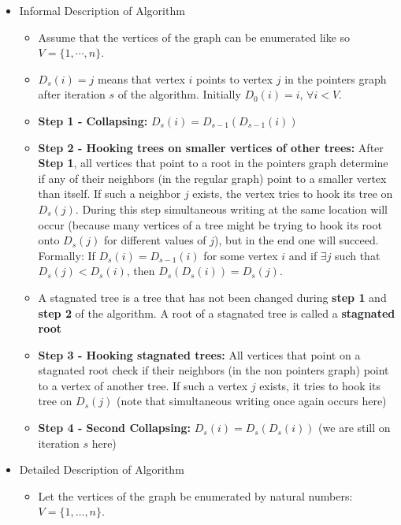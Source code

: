 \documentclass[a4paper]{article}
\begin{document}
\begin{itemize}
\begin{itemize}
\end{itemize}

\item Informal Description of Algorithm
\begin{itemize}
\item Assume that the vertices of the graph can be enumerated like so $V = \{1, \cdots, n\}$. 

\item $D_s(i) = j$ means that vertex $i$ points to vertex $j$ in the pointers graph after iteration $s$ of the algorithm. Initially $D_0(i) = i$, $\forall i < V$.

\item \textbf{Step 1 - Collapsing:} $D_s(i) = D_{s-1}(D_{s-1}(i))$

\item \textbf{Step 2 - Hooking trees on smaller vertices of other trees:} After \textbf{Step 1}, all vertices that point to a root in the pointers graph determine if any of their neighbors (in the regular graph) point to a smaller vertex than itself. If such a neighbor $j$ exists, the vertex tries to hook its tree on $D_s(j)$. During this step simultaneous writing at the same location will occur (because many vertices of a tree might be trying to hook its root onto $D_s(j)$ for different values of $j$), but in the end one will succeed. Formally: If $D_s(i) = D_{s-1}(i)$ for some vertex $i$ and if $\exists j$ such that $D_s(j) < D_s(i)$, then $D_s(D_s(i)) = D_s(j)$.

\item A stagnated tree is a tree that has not been changed during \textbf{step 1} and \textbf{step 2} of the algorithm. A root of a stagnated tree is called a \textbf{stagnated root}

\item \textbf{Step 3 - Hooking stagnated trees:} All vertices that point on a stagnated root check if their neighbors (in the non pointers graph) point to a vertex of another tree. If such a vertex $j$ exists, it tries to hook its tree on $D_s(j)$ (note that simultaneous writing once again occurs here)

\item \textbf{Step 4 - Second Collapsing:} $D_s(i) = D_s(D_s(i))$ (we are still on iteration $s$ here)
 
\end{itemize}

\item Detailed Description of Algorithm
\begin{itemize}
\item Let the vertices of the graph be enumerated by natural numbers: $V = \{1, \ldots, n\}$.


\end{itemize}
\end{itemize}
\end{document}
